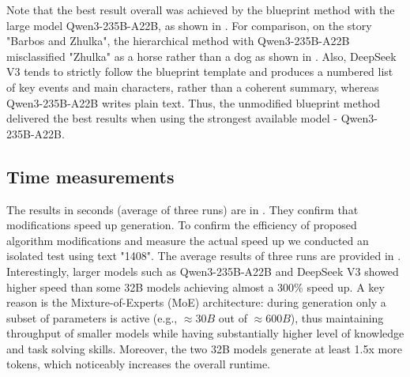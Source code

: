 \documentclass{superfri}
\begin{document}
Note that the best result overall was achieved by the blueprint method with the large model Qwen3-235B-A22B,
as shown in . For comparison, on the story "Barbos and Zhulka",
the hierarchical method with Qwen3-235B-A22B misclassified "Zhulka" as a horse rather than a dog as shown in . 
Also, DeepSeek V3 tends to strictly follow the blueprint template and produces a numbered list
of key events and main characters, rather than a coherent summary, whereas Qwen3-235B-A22B writes plain text.
Thus, the unmodified blueprint method delivered the best results when using the strongest available model - Qwen3-235B-A22B.

\subsection{Time measurements}

The results in seconds (average of three runs) are in .
They confirm that modifications speed up generation.
To confirm the efficiency of proposed algorithm modifications and measure the actual speed up we conducted an isolated test using text "1408". 
The average results of three runs are provided in . 
Interestingly, larger models such as Qwen3-235B-A22B and DeepSeek V3 showed higher speed
than some 32B models achieving almost a 300\% speed up.
A key reason is the Mixture-of-Experts (MoE) architecture:
during generation only a subset of parameters is active (e.g., $\approx30B$ out of $\approx600B$),
thus maintaining throughput of smaller models while having substantially higher level of knowledge and task solving skills.
Moreover, the two 32B models generate at least 1.5x more tokens, which noticeably increases the overall runtime.

\end{document}
